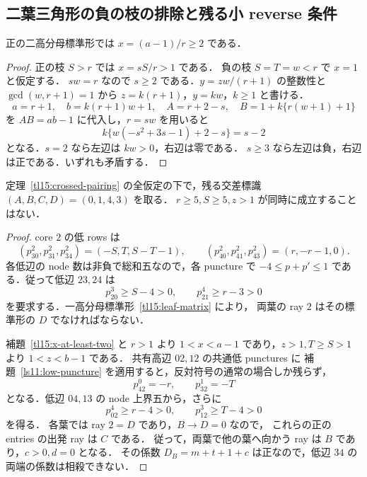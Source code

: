 
\subsection{二葉三角形の負の枝の排除と残る小 reverse 条件}
\label{tl15:negative-section}

\begin{lemma}
\label{tl15:x-at-least-two}
正の二高分母標準形では $x=(a-1)/r\ge2$ である．
\end{lemma}

\begin{proof}
正の枝 $S>r$ では $x=sS/r>1$ である．
負の枝 $S=T=w<r$ で $x=1$ と仮定する．
$s w=r$ なので $s\ge2$ である．$y=zw/(r+1)$ の整数性と
$\gcd(w,r+1)=1$ から $z=k(r+1)$，$y=kw$，$k\ge1$ と書ける．
\[
 a=r+1,\quad b=k(r+1)w+1,\quad
 A=r+2-s,\quad B=1+k\{r(w+1)+1\}
\]
を $AB=ab-1$ に代入し，$r=sw$ を用いると
\[
 k\{w(-s^2+3s-1)+2-s\}=s-2
\]
となる．$s=2$ なら左辺は $kw>0$，右辺は零である．
$s\ge3$ なら左辺は負，右辺は正である．いずれも矛盾する．
\end{proof}

\begin{lemma}
\label{tl15:large-reverse}
定理~\ref{tl15:crossed-pairing} の全仮定の下で，残る交差標識
$(A,B,C,D)=(0,1,4,3)$ を取る．
$r\ge5,S\ge5,z>1$ が同時に成立することはない．
\end{lemma}

\begin{proof}
core $2$ の低 rows は
\[
 (p^2_{30},p^2_{31},p^2_{34})=(-S,T,S-T-1),\qquad
 (p^2_{40},p^2_{41},p^2_{43})=(r,-r-1,0).
\]
各低辺の node 数は非負で総和五なので，各 puncture で
$-4\le p+p'\le1$ である．従って低辺 $23,24$ は
\[
 p^3_{20}\ge S-4>0,\qquad p^4_{21}\ge r-3>0
\]
を要求する．一高分母標準形~\eqref{tl15:leaf-matrix} により，
両葉の ray $2$ はその標準形の $D$ でなければならない．

補題~\ref{tl15:x-at-least-two} と $r>1$ より
$1<x<a-1$ であり，$z>1,T\ge S>1$ より $1<z<b-1$ である．
共有高辺 $02,12$ の共通低 punctures に
補題~\ref{ls11:low-puncture} を適用すると，反対符号の通常の場合しか残らず，
\[
 p^0_{42}=-r,\qquad p^1_{32}=-T
\]
となる．低辺 $04,13$ の node 上界五から，さらに
\[
 p^4_{02}\ge r-4>0,\qquad p^3_{12}\ge T-4>0
\]
を得る．
各葉では ray $2=D$ であり，$B\to D=0$ なので，
これらの正の entries の出発 ray は $C$ である．
従って，両葉で他の葉へ向かう ray は $B$ であり，$c>0,d=0$ となる．
その係数 $D_B=m+t+1+c$ は正なので，低辺 $34$ の両端の係数は相殺できない．
\end{proof}

